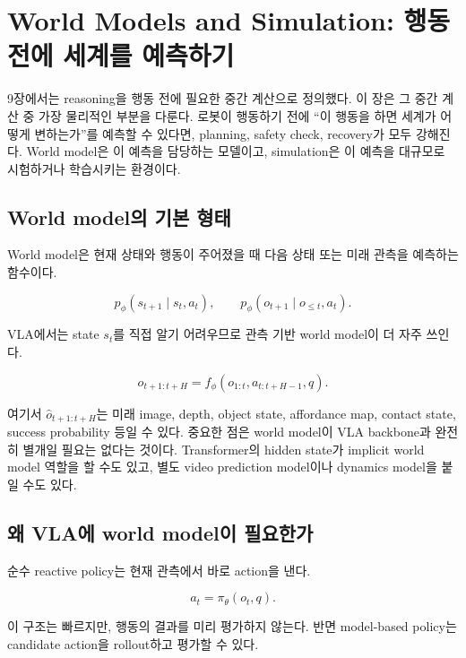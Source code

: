 \chapter{World Models and Simulation: 행동 전에 세계를 예측하기}
\label{ch:world_models_simulation}

9장에서는 reasoning을 행동 전에 필요한 중간 계산으로 정의했다. 이 장은 그 중간 계산 중 가장 물리적인 부분을 다룬다. 로봇이 행동하기 전에 ``이 행동을 하면 세계가 어떻게 변하는가''를 예측할 수 있다면, planning, safety check, recovery가 모두 강해진다. World model은 이 예측을 담당하는 모델이고, simulation은 이 예측을 대규모로 시험하거나 학습시키는 환경이다.

\section{World model의 기본 형태}

World model은 현재 상태와 행동이 주어졌을 때 다음 상태 또는 미래 관측을 예측하는 함수이다.

\begin{equation}
  p_\phi(s_{t+1} \mid s_t,a_t),
  \qquad
  p_\phi(o_{t+1} \mid o_{\le t},a_t).
\end{equation}

VLA에서는 state $s_t$를 직접 알기 어려우므로 관측 기반 world model이 더 자주 쓰인다.

\begin{equation}
  \hat{o}_{t+1:t+H}
  =
  f_\phi(o_{1:t},a_{t:t+H-1},q).
\end{equation}

여기서 $\hat{o}_{t+1:t+H}$는 미래 image, depth, object state, affordance map, contact state, success probability 등일 수 있다. 중요한 점은 world model이 VLA backbone과 완전히 별개일 필요는 없다는 것이다. Transformer의 hidden state가 implicit world model 역할을 할 수도 있고, 별도 video prediction model이나 dynamics model을 붙일 수도 있다.

\section{왜 VLA에 world model이 필요한가}

순수 reactive policy는 현재 관측에서 바로 action을 낸다.

\begin{equation}
  a_t = \pi_\theta(o_t,q).
\end{equation}

이 구조는 빠르지만, 행동의 결과를 미리 평가하지 않는다. 반면 model-based policy는 candidate action을 rollout하고 평가할 수 있다.

